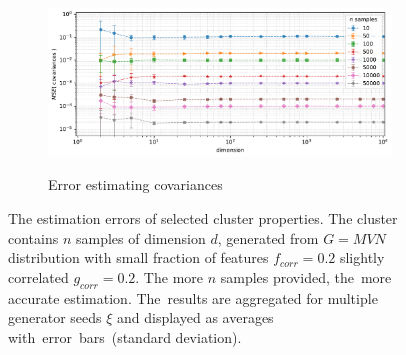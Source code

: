 \begin{figure}[t]
    \vspace{-0.5em}
    \begin{subfigure}[b]{0.9\textwidth}
        \centering
        \caption{\small Error estimating covariances}
        \includegraphics[width=\textwidth]{images/estimation/trend-properties-mse_covs(dimension)-n_correlated_0.20-covariance_0.20-samples_10,50,100,500,1000,5000,10000,50000-aggregated.pdf}
        \label{fig:estimation-covariances}
    \end{subfigure}

    \vspace{-0.5em}
    \caption{The estimation errors of selected cluster properties. The cluster contains $n$ samples of dimension $d$, generated from $G = MVN$ distribution with small fraction of features $f_{corr} = 0.2$ slightly correlated $g_{corr} = 0.2$. The more $n$ samples provided, the~more accurate estimation. The~results are aggregated for multiple generator seeds $\xi$ and displayed as averages with~error~bars~(standard deviation).}
    \label{fig:estimation}
    \vspace{-2.5em}
\end{figure}

